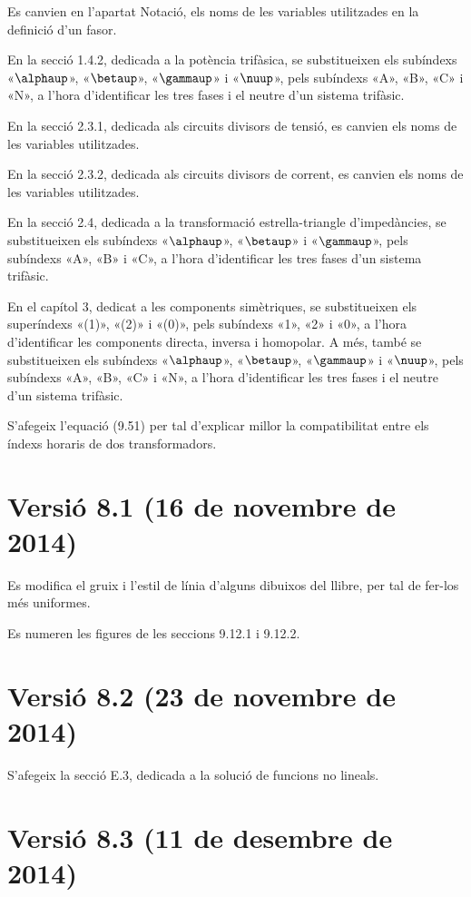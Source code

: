 Es canvien en l'apartat Notació, els noms de les variables utilitzades en la definició d'un fasor.

En la secció 1.4.2, dedicada a la potència trifàsica, se substitueixen els subíndexs «$\alphaup$», «$\betaup$», «$\gammaup$» i «$\nuup$», pels subíndexs «A», «B», «C» i «N», a l'hora d'identificar les tres fases  i el neutre d'un sistema trifàsic.

En la secció 2.3.1,  dedicada als circuits divisors de tensió, es canvien els noms de les variables utilitzades.

En la secció 2.3.2,  dedicada als circuits divisors de corrent, es canvien els noms de les variables utilitzades.

En la secció 2.4, dedicada a la transformació estrella-triangle d'impedàncies, se substitueixen els subíndexs «$\alphaup$», «$\betaup$» i «$\gammaup$», pels subíndexs «A», «B» i «C», a l'hora d'identificar les tres fases d'un sistema trifàsic.

En el capítol 3, dedicat a les components simètriques, se substitueixen els superíndexs «(1)», «(2)» i «(0)», pels subíndexs «1», «2» i «0», a l'hora d'identificar les components directa, inversa i homopolar. A més, també se substitueixen els subíndexs «$\alphaup$», «$\betaup$», «$\gammaup$» i «$\nuup$», pels subíndexs «A», «B»,  «C» i «N», a l'hora d'identificar les tres fases i el neutre d'un sistema trifàsic.

S'afegeix l'equació (9.51) per tal d'explicar millor la compatibilitat entre els índexs horaris de dos transformadors.

\section*{Versió 8.1 (16 de novembre de 2014)}

Es modifica el gruix i l'estil de línia d'alguns dibuixos del llibre, per tal de fer-los més uniformes.

Es numeren les figures de les seccions 9.12.1 i 9.12.2.


\section*{Versió 8.2 (23 de novembre de 2014)}

S'afegeix la secció E.3, dedicada a la solució de funcions no lineals.

\section*{Versió 8.3 (11 de desembre de 2014)}

